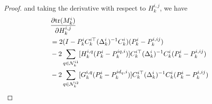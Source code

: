 \documentclass[twocolumn]{IEEEtran}
\newcommand{\tr}{{\rm tr}}
\begin{document}
\begin{proof}
and taking the derivative with respect to $H_{k}^{i,j}$, we have
\begin{equation}\label{H_ijqd}
\begin{split}
&\frac{\partial\tr(M_{k}^i)}{\partial H_{k}^{i,j}}\\
&=2(I-P_{k}^{i}C_{k}^{i\top}(\Delta_{k}^{i})^{-1}C_{k}^{i})(P_{k}^{i}-P_{k}^{i,ij})\\
\quad&-2\sum_{q\in\mathcal{N}_{k}^{i1}}[H_{k}^{i,q}(P_{k}^{i}-P_{k}^{iq,i})]C_{k}^{i\top}(\Delta_{k}^{i})^{-1}C_{k}^{i}(P_{k}^{i}-P_{k}^{i,ij})\\
\quad&-2\sum_{q\in\mathcal{N}_{k}^{i2}}[G_{k}^{i,q}(P_{k}^{i}-P_{k}^{id_q,i})]C_{k}^{i\top}(\Delta_{k}^{i})^{-1}C_{k}^{i}(P_{k}^{i}-P_{k}^{i,ij})\\

\end{split}
\end{equation}
\end{proof}
\end{document}
